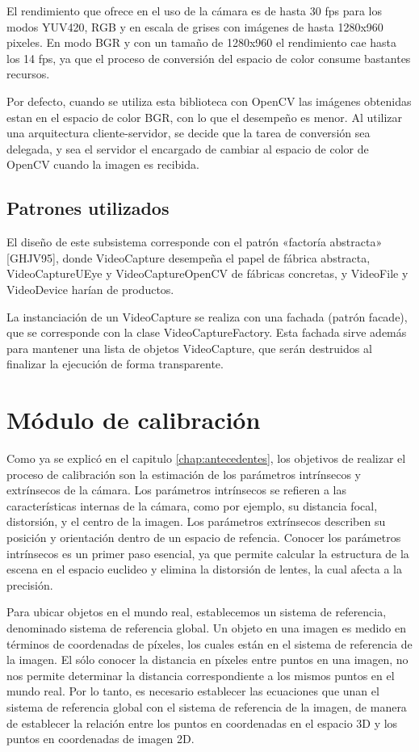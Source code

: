 El rendimiento que ofrece en el uso de la cámara es de hasta 30 fps para los modos YUV420, RGB y en escala de grises con imágenes de hasta 1280x960 pixeles. En modo BGR y con un tamaño de 1280x960 el rendimiento cae hasta los 14 fps, ya que el proceso de conversión del espacio de color consume bastantes recursos. 

Por defecto, cuando se utiliza esta biblioteca con OpenCV las imágenes obtenidas estan en el espacio de color BGR, con lo que el desempeño es menor. Al utilizar una arquitectura cliente-servidor, se decide que la tarea de conversión sea delegada, y sea el servidor el encargado de cambiar al espacio de color de OpenCV cuando la imagen es recibida.

\subsection{Patrones utilizados}
El diseño de este subsistema corresponde con el patrón «factoría abstracta» [GHJV95], donde VideoCapture desempeña el papel de fábrica abstracta, VideoCaptureUEye y VideoCaptureOpenCV de fábricas concretas, y VideoFile y VideoDevice harían de productos.


La instanciación de un VideoCapture se realiza con una fachada (patrón facade), que se corresponde con la clase VideoCaptureFactory. Esta fachada sirve además para mantener una lista de objetos VideoCapture, que serán destruidos al finalizar la ejecución de forma transparente.


\section{Módulo de calibración}
Como ya se explicó en el capitulo \ref{chap:antecedentes}, los objetivos de realizar el proceso de calibración son la estimación de los parámetros intrínsecos y extrínsecos de la cámara. Los parámetros intrínsecos se refieren a las características internas de la cámara, como por ejemplo, su distancia focal, distorsión, y el centro de la imagen. Los parámetros extrínsecos describen su posición y orientación dentro de un espacio de refencia. Conocer los parámetros intrínsecos es un primer paso esencial, ya que permite calcular la estructura de la escena en el espacio euclideo y elimina la distorsión de lentes, la cual afecta a la precisión.

Para ubicar objetos en el mundo real, establecemos un sistema de referencia, denominado sistema de referencia global. Un objeto en una imagen es medido en términos de coordenadas de píxeles, los cuales están en el sistema de referencia de la imagen. El sólo conocer la distancia en píxeles entre puntos en una imagen, no nos permite determinar la distancia correspondiente a los mismos puntos en el mundo real. Por lo tanto, es necesario establecer las ecuaciones que unan el sistema de referencia global con el sistema de referencia de la imagen, de manera de establecer la relación entre los puntos en coordenadas en el espacio 3D y los puntos en coordenadas de imagen 2D. 

